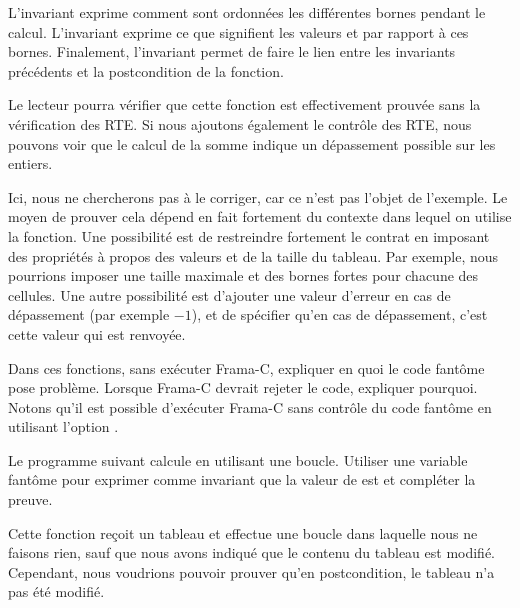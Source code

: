 L'invariant  exprime comment sont ordonnées les différentes bornes
pendant le calcul. L'invariant  exprime ce que signifient les
valeurs  et  par rapport à ces bornes. Finalement,
l'invariant  permet de faire le lien entre les invariants précédents
et la postcondition de la fonction.



Le lecteur pourra vérifier que cette fonction est effectivement prouvée sans la
vérification des RTE. Si nous ajoutons également le contrôle des RTE, nous pouvons
voir que le calcul de la somme indique un dépassement possible sur les entiers.



Ici, nous ne chercherons pas à le corriger, car ce n'est pas l'objet de l'exemple.
Le moyen de prouver cela dépend en fait fortement du contexte dans lequel on
utilise la fonction. Une possibilité est de restreindre fortement le contrat en
imposant des propriétés à propos des valeurs et de la taille du tableau. Par
exemple, nous pourrions imposer une taille maximale et des bornes fortes pour
chacune des cellules. Une autre possibilité est d'ajouter une valeur d'erreur
en cas de dépassement (par exemple $-1$), et de spécifier qu'en cas de
dépassement, c'est cette valeur qui est renvoyée.







Dans ces fonctions, sans exécuter Frama-C, expliquer en quoi le code fantôme
pose problème. Lorsque Frama-C devrait rejeter le code, expliquer pourquoi.
Notons qu'il est possible d'exécuter Frama-C sans contrôle du code fantôme en
utilisant l'option .






Le programme suivant calcule  en utilisant une boucle.
Utiliser une variable fantôme  pour exprimer comme invariant que
la valeur de  est  et compléter la preuve.






Cette fonction reçoit un tableau et effectue une boucle dans laquelle nous ne
faisons rien, sauf que nous avons indiqué que le contenu du tableau est modifié.
Cependant, nous voudrions pouvoir prouver qu'en postcondition, le tableau n'a
pas été modifié.


